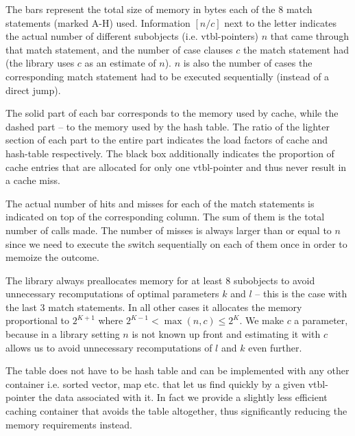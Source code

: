 The bars represent the total size of memory in bytes each of the 8 match 
statements (marked A-H) used. Information $[n/c]$ next to the letter indicates the 
actual number of different subobjects (i.e. vtbl-pointers) $n$ that came through 
that match statement, and the number of case clauses $c$ the match statement had 
(the library uses $c$ as an estimate of $n$). $n$ is also the number of cases the 
corresponding match statement had to be executed sequentially (instead of a 
direct jump).

The solid part of each bar corresponds to the memory used by cache, while the 
dashed part -- to the memory used by the hash table. The ratio of the lighter
section of each part to the entire part indicates the load factors 
of cache and hash-table respectively. The black box additionally indicates the 
proportion of cache entries that are allocated for only one vtbl-pointer and 
thus never result in a cache miss. %

The actual number of hits and misses for each of the match statements is 
indicated on top of the corresponding column. The sum of them is the total 
number of calls made. %
The number of misses is always larger than or equal to $n$ since we need to 
execute the switch sequentially on each of them once in order to memoize the 
outcome.

The library always preallocates memory for at least 8 subobjects to avoid 
unnecessary recomputations of optimal parameters $k$ and $l$ -- this is the case 
with the last 3 match statements. In all other cases it allocates the 
memory proportional to $2^{K+1}$ where $2^{K-1} < \max(n,c) \le 2^{K}$. We make 
$c$ a parameter, because in a library setting $n$ is not known up front and 
estimating it with $c$ allows us to avoid unnecessary recomputations of $l$ and 
$k$ even further. 

The table does not have to be hash table and can be implemented with 
any other container i.e. sorted vector, map etc. that let us find quickly by a given 
vtbl-pointer the data associated with it. In fact we provide a slightly less 
efficient caching container that avoids the table altogether, thus significantly 
reducing the memory requirements instead.

